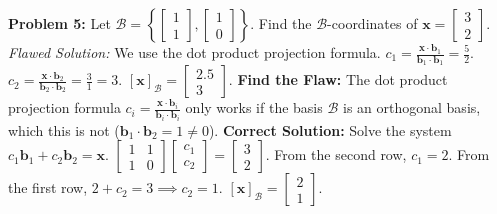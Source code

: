 \documentclass[11pt]{article}
\begin{document}
\vspace{0.5cm}

\textbf{Problem 5:} Let $\mathcal{B} = \left\{ \begin{bmatrix} 1 \\ 1 \end{bmatrix}, \begin{bmatrix} 1 \\ 0 \end{bmatrix} \right\}$. Find the $\mathcal{B}$-coordinates of $\mathbf{x} = \begin{bmatrix} 3 \\ 2 \end{bmatrix}$.
\textit{Flawed Solution:} We use the dot product projection formula.
$c_1 = \frac{\mathbf{x} \cdot \mathbf{b}_1}{\mathbf{b}_1 \cdot \mathbf{b}_1} = \frac{5}{2}$. $c_2 = \frac{\mathbf{x} \cdot \mathbf{b}_2}{\mathbf{b}_2 \cdot \mathbf{b}_2} = \frac{3}{1} = 3$.
$[\mathbf{x}]_{\mathcal{B}} = \begin{bmatrix} 2.5 \\ 3 \end{bmatrix}$.
\textbf{Find the Flaw:} The dot product projection formula $c_i = \frac{\mathbf{x} \cdot \mathbf{b}_i}{\mathbf{b}_i \cdot \mathbf{b}_i}$ only works if the basis $\mathcal{B}$ is an orthogonal basis, which this is not ($\mathbf{b}_1 \cdot \mathbf{b}_2 = 1 \neq 0$).
\textbf{Correct Solution:} Solve the system $c_1\mathbf{b}_1 + c_2\mathbf{b}_2 = \mathbf{x}$.
$\begin{bmatrix} 1 & 1 \\ 1 & 0 \end{bmatrix} \begin{bmatrix} c_1 \\ c_2 \end{bmatrix} = \begin{bmatrix} 3 \\ 2 \end{bmatrix}$.
From the second row, $c_1 = 2$. From the first row, $2 + c_2 = 3 \implies c_2 = 1$.
$[\mathbf{x}]_{\mathcal{B}} = \begin{bmatrix} 2 \\ 1 \end{bmatrix}$.
\end{document}
